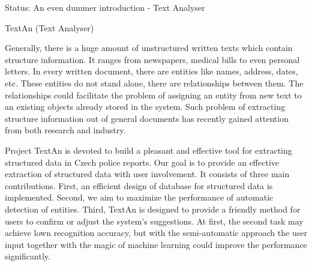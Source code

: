 Status: An even dummer introduction - Text Analyser

TextAn (Text Analyser)

Generally, there is a huge amount of unstructured written texts which contain structure information.
It ranges from newspapers, medical bills to even personal letters.
In every written document, there are entities like names, address, dates, etc.
These entities do not stand alone, there are relationships between them.
The relationships could facilitate the problem of assigning an entity from new text to an existing objects already stored in the system.
Such problem of extracting structure information out of general documents has recently gained attention from both research and industry.


Project TextAn is devoted to build a pleasant and effective tool for extracting structured data in Czech police reports. 
Our goal is to provide an effective extraction of structured data with user involvement.
It consists of three main contributions.
First, an efficient design of database for structured data is implemented.
Second, we aim to maximize the performance of automatic detection of entities.
Third, TextAn is designed to provide a friendly method for users to confirm or adjust the system's suggestions.
At first, the second task may achieve lown recognition accuracy,
but with the semi-automatic approach the user input together with the magic of machine learning could improve the performance significantly. 
